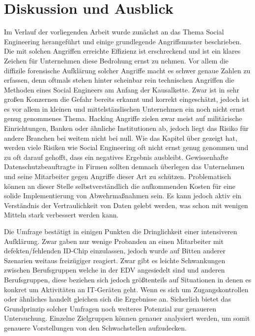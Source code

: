 \section{Diskussion und Ausblick}\label{diskussion-und-ausblick}

Im Verlauf der vorliegenden Arbeit wurde zunächst an das Thema Social Engineering herangeführt und einige grundlegende Angriffsmuster beschrieben.
Die mit solchen Angriffen erreichte Effizienz ist erschreckend und ist ein klares Zeichen für Unternehmen diese Bedrohung ernst zu nehmen.
Vor allem die diffizile forensische Aufklärung solcher Angriffe macht es schwer genaue Zahlen zu erfassen, denn oftmals stehen hinter scheinbar rein technischen Angriffen die Methoden eines Social Engineers am Anfang der Kausalkette.
Zwar ist in sehr großen Konzernen die Gefahr bereits erkannt und korrekt eingeschätzt, jedoch ist es vor allem in kleinen und mittelständischen Unternehmen ein noch nicht ernst genug genommenes Thema.
Hacking Angriffe zielen zwar meist auf militärische Einrichtungen, Banken oder ähnliche Institutionen ab, jedoch liegt das Risiko für andere Branchen bei weitem nicht bei null.
Wie das Kapitel über  gezeigt hat, werden viele Risiken wie Social Engineering oft nicht ernst genug genommen und zu oft darauf gehofft, dass ein negatives Ergebnis ausbleibt.
Gewissenhafte Datenschutzbeauftragte in Firmen sollten demnach überlegen das Unternehmen und seine Mitarbeiter gegen Angriffe dieser Art zu schützen.
Problematisch können an dieser Stelle selbstverständlich die aufkommenden Kosten für eine solide Implementierung von Abwehrmaßnahmen sein.
Es kann jedoch aktiv ein Verständnis der Vertraulichkeit von Daten gelebt werden, was schon mit wenigen Mitteln stark verbessert werden kann.

Die Umfrage bestätigt in einigen Punkten die Dringlichkeit einer intensiveren Aufklärung.
Zwar gaben nur wenige Probanden an einen Mitarbeiter mit defekten/fehlenden ID-Chip einzulassen, jedoch wurde auf Bitten anderer Szenarien weitaus freizügiger reagiert.
Zwar gibt es leichte Schwankungen zwischen Berufsgruppen welche in der EDV angesiedelt sind und anderen Berufsgruppen, diese beziehen sich jedoch größtenteils auf Situationen in denen es konkret um Aktivitäten an IT-Geräten geht.
Wenn es sich um Zugangskontrollen oder ähnliches handelt gleichen sich die Ergebnisse an.
Sicherlich bietet das Grundprinzip solcher Umfragen noch weiteres Potenzial zur genaueren Untersuchung.
Einzelne Zielgruppen können genauer analysiert werden, um somit genauere Vorstellungen von den Schwachstellen aufzudecken.

